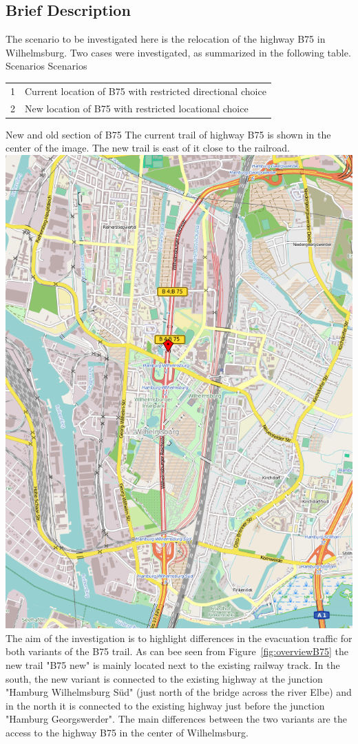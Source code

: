 \subsection{Brief Description}
The scenario to be investigated here is the relocation of the highway B75 in Wilhelmsburg. Two cases were investigated, as summarized in the following table.
%
\createtable%
	{Scenarios}%
	{Scenarios}%
	{\label{table:b75scenarios}}%
	{%
	\begin{tabular}{|l | l|}
	\hline
	1 & Current location of B75 with restricted directional choice\\
	2 & New location of B75 with restricted locational choice\\
	\hline
\end{tabular}
}%
{}%
%
\createfigure%
	{New and old section of B75}%
	{The current trail of highway B75 is shown in the center of the image. The new trail is east of it close to the railroad.}%
	{\label{fig:overviewB75}}%
	{\includegraphics[width=0.7\linewidth]{using/figures/B75overview}}%
{}
%
The aim of the investigation is to highlight differences in the evacuation traffic for both variants of the B75 trail. As can bee seen from Figure~\ref{fig:overviewB75} the new trail "B75 new" is mainly located next to the existing railway track. In the south, the new variant is connected to the existing highway at the junction "Hamburg Wilhelmsburg Süd" (just north of the bridge across the river Elbe) and in the north it is connected to the existing highway just before the junction "Hamburg Georgswerder". The main differences between the two variants are the access to the highway B75 in the center of Wilhelmsburg.

